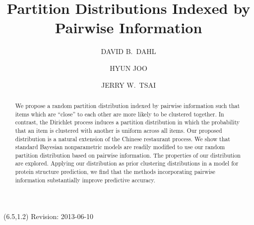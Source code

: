 \documentclass[lineno]{biometrika-dbd}
\newcommand{\draft}[1]{\iftoggle{draft}{#1}{}}
\newcommand{\todo}[1]{{\color{red} #1}}
\begin{document}



\title{Partition Distributions Indexed by Pairwise Information}

\author{DAVID B.\ DAHL}

\author{HYUN JOO}

\author{JERRY W.\ TSAI}

\maketitle

\begin{textblock}{8}(6.5,1.2)
\todo{Revision: 2013-06-10}
\end{textblock}

\begin{abstract}
We propose a random partition distribution indexed by pairwise information such
that items which are ``close'' to each other are more likely to be clustered
together.  In contrast, the Dirichlet process induces a partition distribution
in which the probability that an item is clustered with another is uniform
across all items.  Our proposed distribution is a natural extension of the
Chinese restaurant process.  We show that standard Bayesian nonparametric
models are readily modified to use our random partition distribution based on
pairwise information.  The properties of our distribution are explored.
Applying our distribution as prior clustering distributions in a model for
protein structure prediction, we find that the methods incorporating pairwise
information substantially improve predictive accuracy.
\end{abstract}
\end{document}
